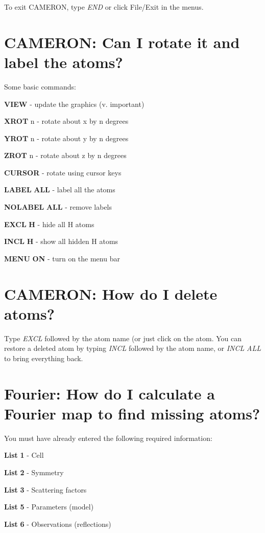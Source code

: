 \documentclass[10pt,a4paper]{report}
\begin{document}
To exit CAMERON, type \emph{END} or click File/Exit in the menus.

\section{CAMERON: Can I rotate it and label the atoms?}


Some basic commands:




 {\bf VIEW} - update the graphics (v. important)


 {\bf XROT} n - rotate about x by n degrees


 {\bf YROT} n - rotate about y by n degrees


 {\bf ZROT} n - rotate about z by n degrees


 {\bf CURSOR} - rotate using cursor keys


 {\bf LABEL} {\bf ALL} - label all the atoms


 {\bf NOLABEL} {\bf ALL} - remove labels


 {\bf EXCL} {\bf H} - hide all H atoms


 {\bf INCL} {\bf H} - show all hidden H atoms


 {\bf MENU} {\bf ON} - turn on the menu bar

\section{CAMERON: How do I delete atoms?}


Type \emph{EXCL} followed by the atom name (or
just click on the atom. You can restore a deleted
atom by typing \emph{INCL} followed by the atom name, or
\emph{INCL} \emph{ALL} to bring everything back.



\section{Fourier: How do I calculate a Fourier map to find missing atoms?}


You must have already entered the following required information:




 {\bf List} {\bf 1} - Cell


 {\bf List} {\bf 2} - Symmetry


 {\bf List} {\bf 3} - Scattering factors


 {\bf List} {\bf 5} - Parameters (model)


 {\bf List} {\bf 6} - Observations (reflections)
\end{document}
